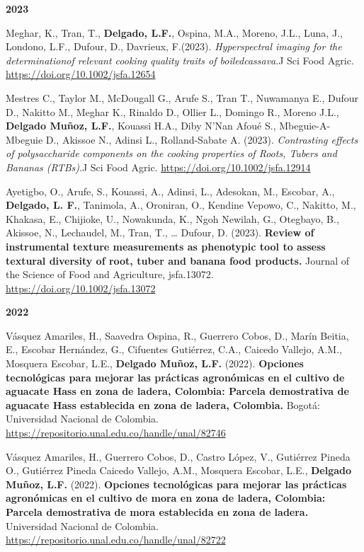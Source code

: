 \documentclass[11pt,a4paper,]{awesome-cv}
\begin{document}
\footnotesize

\setlength{\leftskip}{0cm}

\textbf{2023}

\setlength{\leftskip}{1cm}

Meghar, K., Tran, T., \textbf{Delgado, L.F.}, Ospina, M.A., Moreno,
J.L., Luna, J., Londono, L.F., Dufour, D., Davrieux, F.(2023).
\emph{Hyperspectral imaging for the determinationof relevant cooking
quality traits of boiledcassava}.J Sci Food Agric.
\url{https://doi.org/10.1002/jsfa.12654}

Mestres C., Taylor M., McDougall G., Arufe S., Tran T., Nuwamanya E.,
Dufour D., Nakitto M., Meghar K., Rinaldo D., Ollier L., Domingo R.,
Moreno J.L., \textbf{Delgado Muñoz, L.F.}, Kouassi H.A., Diby N'Nan
Afoué S., Mbeguie-A-Mbeguie D., Akissoe N., Adinsi L., Rolland-Sabate A.
(2023). \emph{Contrasting effects of polysaccharide components on the
cooking properties of Roots, Tubers and Bananas (RTBs)}.J Sci Food
Agric. \url{https://doi.org/10.1002/jsfa.12914}

Ayetigbo, O., Arufe, S., Kouassi, A., Adinsi, L., Adesokan, M., Escobar,
A., \textbf{Delgado, L. F.}, Tanimola, A., Oroniran, O., Kendine Vepowo,
C., Nakitto, M., Khakasa, E., Chijioke, U., Nowakunda, K., Ngoh Newilah,
G., Otegbayo, B., Akissoe, N., Lechaudel, M., Tran, T., \ldots{} Dufour,
D. (2023). \textbf{Review of instrumental texture measurements as
phenotypic tool to assess textural diversity of root, tuber and banana
food products.} Journal of the Science of Food and Agriculture,
jsfa.13072. \url{https://doi.org/10.1002/jsfa.13072}

\setlength{\leftskip}{0cm}

\textbf{2022}

\setlength{\leftskip}{1cm}

Vásquez Amariles, H., Saavedra Ospina, R., Guerrero Cobos, D., Marín
Beitia, E., Escobar Hernández, G., Cifuentes Gutiérrez, C.A., Caicedo
Vallejo, A.M., Mosquera Escobar, L.E., \textbf{Delgado Muñoz, L.F.}
(2022). \textbf{Opciones tecnológicas para mejorar las prácticas
agronómicas en el cultivo de aguacate Hass en zona de ladera, Colombia:
Parcela demostrativa de aguacate Hass establecida en zona de ladera,
Colombia.} Bogotá: Universidad Nacional de Colombia.
\url{https://repositorio.unal.edu.co/handle/unal/82746}

Vásquez Amariles, H., Guerrero Cobos, D., Castro López, V., Gutiérrez
Pineda O., Gutiérrez Pineda Caicedo Vallejo, A.M., Mosquera Escobar,
L.E., \textbf{Delgado Muñoz, L.F.} (2022). \textbf{Opciones tecnológicas
para mejorar las prácticas agronómicas en el cultivo de mora en zona de
ladera, Colombia: Parcela demostrativa de mora establecida en zona de
ladera.} Universidad Nacional de Colombia.
\url{https://repositorio.unal.edu.co/handle/unal/82722}
\end{document}
